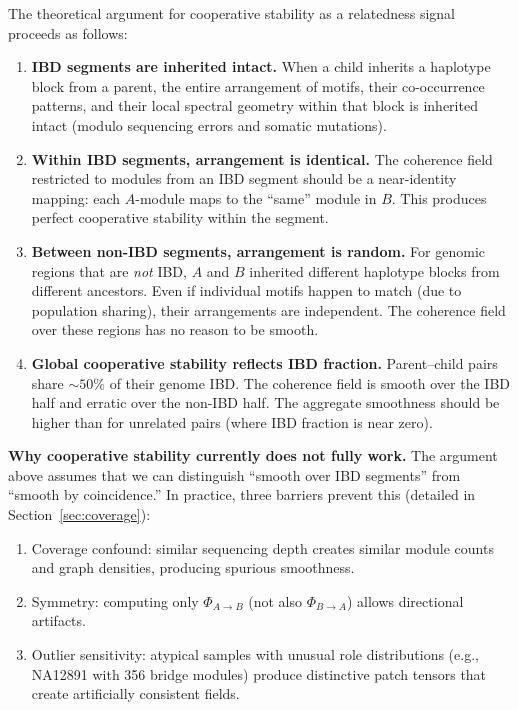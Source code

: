 \documentclass{../yalumba}
\begin{document}
The theoretical argument for cooperative stability as a relatedness
signal proceeds as follows:

\begin{enumerate}
  \item \textbf{IBD segments are inherited intact.}  When a child
    inherits a haplotype block from a parent, the entire arrangement of
    motifs, their co-occurrence patterns, and their local spectral
    geometry within that block is inherited intact (modulo sequencing
    errors and somatic mutations).

  \item \textbf{Within IBD segments, arrangement is identical.}  The
    coherence field restricted to modules from an IBD segment should be
    a near-identity mapping: each $A$-module maps to the ``same'' module
    in $B$.  This produces perfect cooperative stability within the
    segment.

  \item \textbf{Between non-IBD segments, arrangement is random.}  For
    genomic regions that are \emph{not} IBD, $A$ and $B$ inherited
    different haplotype blocks from different ancestors.  Even if
    individual motifs happen to match (due to population sharing),
    their arrangements are independent.  The coherence field over these
    regions has no reason to be smooth.

  \item \textbf{Global cooperative stability reflects IBD fraction.}
    Parent--child pairs share $\sim 50\%$ of their genome IBD.  The
    coherence field is smooth over the IBD half and erratic over the
    non-IBD half.  The aggregate smoothness should be higher than for
    unrelated pairs (where IBD fraction is near zero).
\end{enumerate}

\begin{limitation}
\textbf{Why cooperative stability currently does not fully work.}
The argument above assumes that we can distinguish ``smooth over IBD
segments'' from ``smooth by coincidence.''  In practice, three barriers
prevent this (detailed in Section~\ref{sec:coverage}):
\begin{enumerate}
  \item Coverage confound: similar sequencing depth creates similar
    module counts and graph densities, producing spurious smoothness.
  \item Symmetry: computing only $\Phi_{A \to B}$ (not also $\Phi_{B
    \to A}$) allows directional artifacts.
  \item Outlier sensitivity: atypical samples with unusual role
    distributions (e.g., NA12891 with 356 bridge modules) produce
    distinctive patch tensors that create artificially consistent
    fields.
\end{enumerate}
\end{limitation}
\end{document}
